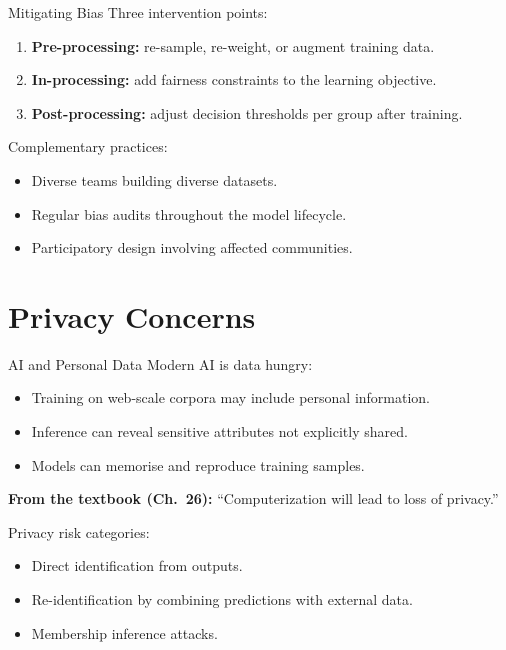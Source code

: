 \documentclass[10pt]{beamer}
\begin{document}
\begin{frame}{Mitigating Bias}
    Three intervention points:
    \begin{enumerate}
        \item \textbf{Pre-processing:} re-sample, re-weight, or augment training data.
        \item \textbf{In-processing:} add fairness constraints to the learning objective.
        \item \textbf{Post-processing:} adjust decision thresholds per group after training.
    \end{enumerate}

    \vspace{0.2cm}
    Complementary practices:
    \begin{itemize}
        \item Diverse teams building diverse datasets.
        \item Regular bias audits throughout the model lifecycle.
        \item Participatory design involving affected communities.
    \end{itemize}
\end{frame}

\section{Privacy Concerns}

\begin{frame}{AI and Personal Data}
    Modern AI is data hungry:
    \begin{itemize}
        \item Training on web-scale corpora may include personal information.
        \item Inference can reveal sensitive attributes not explicitly shared.
        \item Models can memorise and reproduce training samples.
    \end{itemize}

    \vspace{0.2cm}
    \textbf{From the textbook (Ch.~26):} ``Computerization will lead to loss of privacy.''

    \vspace{0.2cm}
    Privacy risk categories:
    \begin{itemize}
        \item Direct identification from outputs.
        \item Re-identification by combining predictions with external data.
        \item Membership inference attacks.
    \end{itemize}
\end{frame}
\end{document}
